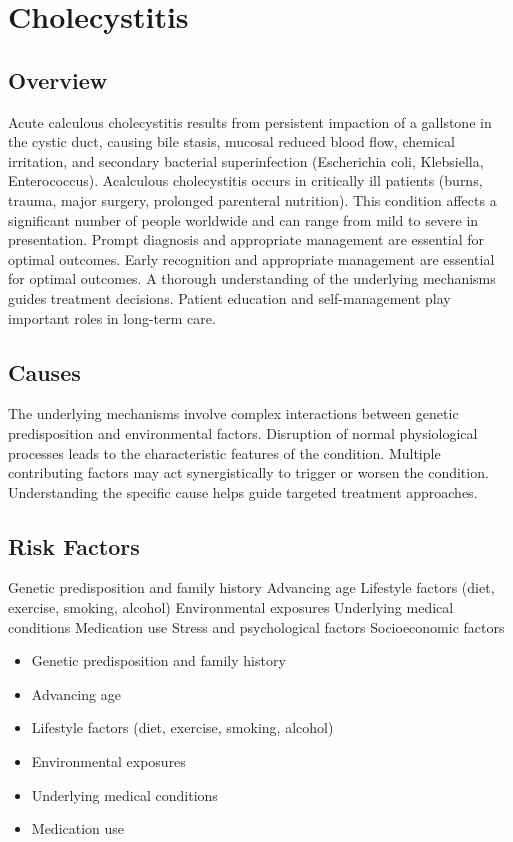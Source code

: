 \chapter{Cholecystitis}
\label{sec:Cholecystitis}

\section{Overview}
Acute calculous cholecystitis results from persistent impaction of a gallstone in the cystic duct, causing bile stasis, mucosal reduced blood flow, chemical irritation, and secondary bacterial superinfection (Escherichia coli, Klebsiella, Enterococcus). Acalculous cholecystitis occurs in critically ill patients (burns, trauma, major surgery, prolonged parenteral nutrition). This condition affects a significant number of people worldwide and can range from mild to severe in presentation. Prompt diagnosis and appropriate management are essential for optimal outcomes. Early recognition and appropriate management are essential for optimal outcomes. A thorough understanding of the underlying mechanisms guides treatment decisions. Patient education and self-management play important roles in long-term care.
\section{Causes}
The underlying mechanisms involve complex interactions between genetic predisposition and environmental factors. Disruption of normal physiological processes leads to the characteristic features of the condition. Multiple contributing factors may act synergistically to trigger or worsen the condition. Understanding the specific cause helps guide targeted treatment approaches.
\section{Risk Factors}
Genetic predisposition and family history Advancing age Lifestyle factors (diet, exercise, smoking, alcohol) Environmental exposures Underlying medical conditions Medication use Stress and psychological factors Socioeconomic factors

\begin{itemize}[noitemsep]
  \item Genetic predisposition and family history
  \item Advancing age
  \item Lifestyle factors (diet, exercise, smoking, alcohol)
  \item Environmental exposures
  \item Underlying medical conditions
  \item Medication use
\end{itemize}
